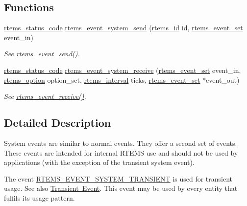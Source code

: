 \subsection*{Functions}
\begin{DoxyCompactItemize}
\item 
\mbox{\label{group__ClassicEventSystem_ga1119cb4341890e86ffa7cc7fad414f19}} 
\mbox{\hyperlink{group__ClassicStatus_ga545d41846817eaba6143d52ee4d9e9fe}{rtems\+\_\+status\+\_\+code}} \mbox{\hyperlink{group__ClassicEventSystem_ga1119cb4341890e86ffa7cc7fad414f19}{rtems\+\_\+event\+\_\+system\+\_\+send}} (\mbox{\hyperlink{group__ClassicTasks_gab20892b814dced7dd4e5b9bf42becd57}{rtems\+\_\+id}} id, \mbox{\hyperlink{group__ClassicEventSet_gab7b8f373bea85fd4e3b7ae23905faa07}{rtems\+\_\+event\+\_\+set}} event\+\_\+in)
\begin{DoxyCompactList}\small\item\em See \mbox{\hyperlink{group__ClassicEvent_ga2d31674c165127bc530178d06d557b94}{rtems\+\_\+event\+\_\+send()}}. \end{DoxyCompactList}\item 
\mbox{\label{group__ClassicEventSystem_ga10c79eebe1e9c1b00eb72017bb67daf7}} 
\mbox{\hyperlink{group__ClassicStatus_ga545d41846817eaba6143d52ee4d9e9fe}{rtems\+\_\+status\+\_\+code}} \mbox{\hyperlink{group__ClassicEventSystem_ga10c79eebe1e9c1b00eb72017bb67daf7}{rtems\+\_\+event\+\_\+system\+\_\+receive}} (\mbox{\hyperlink{group__ClassicEventSet_gab7b8f373bea85fd4e3b7ae23905faa07}{rtems\+\_\+event\+\_\+set}} event\+\_\+in, \mbox{\hyperlink{group__ClassicOptions_gad26685eb0e60a9650082935c31920e29}{rtems\+\_\+option}} option\+\_\+set, \mbox{\hyperlink{group__ClassicTasks_gad39c43f949683d46874e3a5586b93aee}{rtems\+\_\+interval}} ticks, \mbox{\hyperlink{group__ClassicEventSet_gab7b8f373bea85fd4e3b7ae23905faa07}{rtems\+\_\+event\+\_\+set}} $\ast$event\+\_\+out)
\begin{DoxyCompactList}\small\item\em See \mbox{\hyperlink{group__ClassicEvent_ga87a7b47e1856045e4361f5619ad697cb}{rtems\+\_\+event\+\_\+receive()}}. \end{DoxyCompactList}\end{DoxyCompactItemize}


\subsection{Detailed Description}
System events are similar to normal events. They offer a second set of events. These events are intended for internal R\+T\+E\+MS use and should not be used by applications (with the exception of the transient system event).

The event \mbox{\hyperlink{group__ClassicEventSystem_gace35bdbb8d804a49ca2d5eff5a90e214}{R\+T\+E\+M\+S\+\_\+\+E\+V\+E\+N\+T\+\_\+\+S\+Y\+S\+T\+E\+M\+\_\+\+T\+R\+A\+N\+S\+I\+E\+NT}} is used for transient usage. See also \mbox{\hyperlink{group__ClassicEventTransient}{Transient Event}}. This event may be used by every entity that fulfils its usage pattern. 